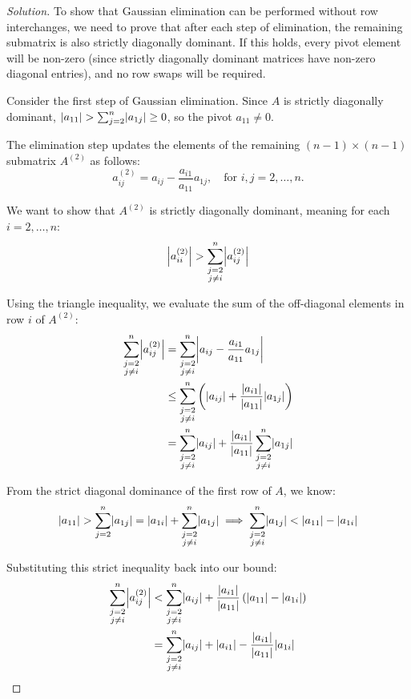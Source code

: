 \documentclass[11pt, a4paper]{article}
\DeclarePairedDelimiter\abs{\lvert}{\rvert}
\newif\ifsolutionnewpage
\newenvironment{solution}
  {\begin{proof}[Solution]}
  {\end{proof}\ifsolutionnewpage\newpage\fi}
\begin{document}
\begin{solution}
    To show that Gaussian elimination can be performed without row interchanges, we need to prove that after each step of elimination, the remaining submatrix is also strictly diagonally dominant. If this holds, every pivot element will be non-zero (since strictly diagonally dominant matrices have non-zero diagonal entries), and no row swaps will be required.

    Consider the first step of Gaussian elimination. Since $A$ is strictly diagonally dominant, $\abs{a_{11}} > \sum_{j=2}^n \abs{a_{1j}} \ge 0$, so the pivot $a_{11} \neq 0$. 
    
    The elimination step updates the elements of the remaining $(n-1) \times (n-1)$ submatrix $A^{(2)}$ as follows:
    \[
    a_{ij}^{(2)} = a_{ij} - \frac{a_{i1}}{a_{11}} a_{1j}, \quad \text{for } i, j = 2, \dots, n.
    \]
    
    We want to show that $A^{(2)}$ is strictly diagonally dominant, meaning for each $i = 2, \dots, n$:
    \[
    \abs*{a_{ii}^{(2)}} > \sum_{\substack{j=2 \\ j \neq i}}^n \abs*{a_{ij}^{(2)}}
    \]
    
    Using the triangle inequality, we evaluate the sum of the off-diagonal elements in row $i$ of $A^{(2)}$:
    \begin{align*}
        \sum_{\substack{j=2 \\ j \neq i}}^n \abs*{a_{ij}^{(2)}} &= \sum_{\substack{j=2 \\ j \neq i}}^n \abs*{a_{ij} - \frac{a_{i1}}{a_{11}} a_{1j}} \\
        &\le \sum_{\substack{j=2 \\ j \neq i}}^n \left( \abs{a_{ij}} + \frac{\abs{a_{i1}}}{\abs{a_{11}}} \abs{a_{1j}} \right) \\
        &= \sum_{\substack{j=2 \\ j \neq i}}^n \abs{a_{ij}} + \frac{\abs{a_{i1}}}{\abs{a_{11}}} \sum_{\substack{j=2 \\ j \neq i}}^n \abs{a_{1j}}
    \end{align*}
    
    From the strict diagonal dominance of the first row of $A$, we know:
    \[
    \abs{a_{11}} > \sum_{j=2}^n \abs{a_{1j}} = \abs{a_{1i}} + \sum_{\substack{j=2 \\ j \neq i}}^n \abs{a_{1j}} \implies \sum_{\substack{j=2 \\ j \neq i}}^n \abs{a_{1j}} < \abs{a_{11}} - \abs{a_{1i}}
    \]
    
    Substituting this strict inequality back into our bound:
    \begin{align*}
        \sum_{\substack{j=2 \\ j \neq i}}^n \abs*{a_{ij}^{(2)}} &< \sum_{\substack{j=2 \\ j \neq i}}^n \abs{a_{ij}} + \frac{\abs{a_{i1}}}{\abs{a_{11}}} \left( \abs{a_{11}} - \abs{a_{1i}} \right) \\
        &= \sum_{\substack{j=2 \\ j \neq i}}^n \abs{a_{ij}} + \abs{a_{i1}} - \frac{\abs{a_{i1}}}{\abs{a_{11}}} \abs{a_{1i}}
    \end{align*}
    

\end{solution}
\end{document}
